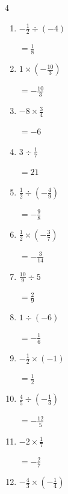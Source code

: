 \begin{multicols}{4}
\begin{enumerate}
        $\displaystyle =-\frac{3}{4}$

  \item $\displaystyle -\frac{1}{2}\div{}\left(-4\right)$

        $\displaystyle =\frac{1}{8}$

  \item $\displaystyle 1\times{}\left(-\frac{10}{3}\right)$

        $\displaystyle =-\frac{10}{3}$

  \item $\displaystyle -8\times{}\frac{3}{4}$

        $\displaystyle =-6$

  \item $\displaystyle 3\div{}\frac{1}{7}$

        $\displaystyle =21$

  \item $\displaystyle \frac{1}{2}\div{}\left(-\frac{4}{9}\right)$

        $\displaystyle =-\frac{9}{8}$

  \item $\displaystyle \frac{1}{2}\times{}\left(-\frac{3}{7}\right)$

        $\displaystyle =-\frac{3}{14}$

\columnbreak %

  \item $\displaystyle \frac{10}{9}\div{}5$

        $\displaystyle =\frac{2}{9}$

  \item $\displaystyle 1\div{}\left(-6\right)$

        $\displaystyle =-\frac{1}{6}$

  \item $\displaystyle -\frac{1}{2}\times{}\left(-1\right)$

        $\displaystyle =\frac{1}{2}$

  \item $\displaystyle \frac{4}{5}\div{}\left(-\frac{1}{3}\right)$

        $\displaystyle =-\frac{12}{5}$

  \item $\displaystyle -2\times{}\frac{1}{7}$

        $\displaystyle =-\frac{2}{7}$

  \item $\displaystyle -\frac{4}{3}\times{}\left(-\frac{1}{4}\right)$


\end{enumerate}
\end{multicols}
